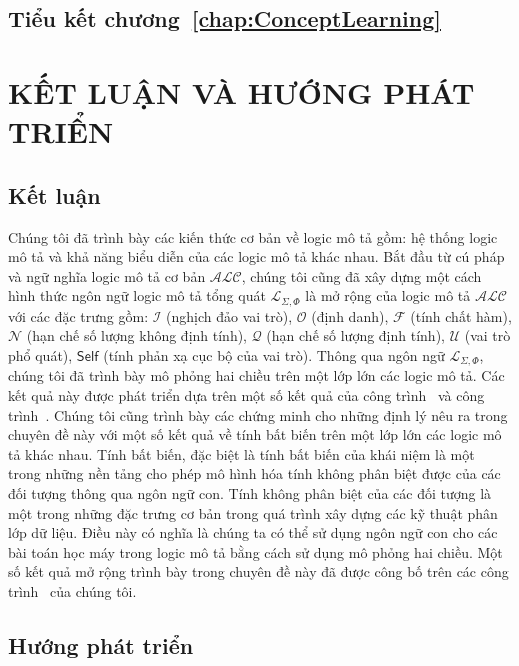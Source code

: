 \documentclass[12pt,a4paper,twoside]{report}
\newcommand{\mL}		{\mathcal{L}}
\newcommand{\mI}		{\mathcal{I}}
\newcommand{\mO}		{\mathcal{O}}
\newcommand{\mN}		{\mathcal{N}}
\newcommand{\mQ}		{\mathcal{Q}}
\newcommand{\mF}		{\mathcal{F}}
\newcommand{\mU}		{\mathcal{U}}
\newcommand{\Self}		{\mathsf{Self}}
\newcommand{\mLSP}		{\mL_{\Sigma,\Phi}}
\newcommand{\ALC}		{$\mathcal{ALC}$\xspace}
\theoremstyle{definition}
\begin{document}
\section*{Tiểu kết chương~\ref{chap:ConceptLearning}}

\chapter*{KẾT LUẬN VÀ HƯỚNG PHÁT TRIỂN}
\label{sec:Conclusion}

\section*{Kết luận}
Chúng tôi đã trình bày các kiến thức cơ bản về logic mô tả gồm: hệ thống logic mô tả và khả năng biểu diễn của các logic mô tả khác nhau. Bắt đầu từ cú pháp và ngữ nghĩa logic mô tả cơ bản \ALC, chúng tôi cũng đã xây dựng một cách hình thức ngôn ngữ logic mô tả tổng quát $\mLSP$ là mở rộng của logic mô tả \ALC với các đặc trưng gồm: $\mI$ ({nghịch đảo vai trò}), $\mO$ ({định danh}), $\mF$ ({tính chất hàm}), $\mN$ ({hạn chế số lượng không định tính}), $\mQ$ ({hạn chế số lượng định tính}), $\mU$ ({vai trò phổ quát}), $\Self$ ({tính phản xạ cục bộ của vai trò}). Thông qua ngôn ngữ $\mLSP$, chúng tôi đã trình bày mô phỏng hai chiều trên một lớp lớn các logic mô tả. Các kết quả này được phát triển dựa trên một số kết quả của công trình~\cite{Divroodi2011B} và công trình~\cite{Nguyen2013}. Chúng tôi cũng trình bày các chứng minh cho những định lý nêu ra trong chuyên đề này với một số kết quả về tính bất biến trên một lớp lớn các logic mô tả khác nhau. Tính bất biến, đặc biệt là tính bất biến của khái niệm là một trong những nền tảng cho phép mô hình hóa tính không phân biệt được của các đối tượng thông qua ngôn ngữ con. Tính không phân biệt của các đối tượng là một trong những đặc trưng cơ bản trong quá trình xây dựng các kỹ thuật phân lớp dữ liệu. Điều này có nghĩa là chúng ta có thể sử dụng ngôn ngữ con cho các bài toán học máy trong logic mô tả bằng cách sử dụng mô phỏng hai chiều. Một số kết quả mở rộng trình bày trong chuyên đề này đã được công bố trên các công trình~\cite{Tran2012,Ha2012} của chúng tôi.

\section*{Hướng phát triển}
\newpage
%
\renewcommand\refname{Tài liệu tham khảo}

\begin{small} 

\end{small} 
\end{document}
